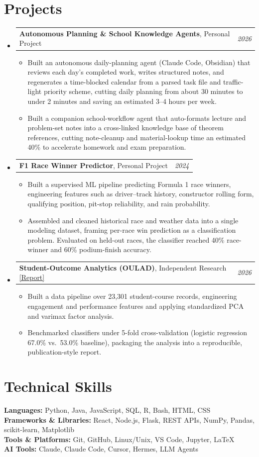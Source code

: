 \documentclass[letterpaper,11pt]{article}
\makeatletter
\newcommand{\resumeItem}[1]{
  \item\small{
    {#1 \vspace{-3pt}}
  }
}
\newcommand{\resumeProjectHeading}[2]{
    \item
    \begin{tabular*}{0.97\textwidth}{l@{\extracolsep{\fill}}r}
      \small#1 & #2 \\
    \end{tabular*}\vspace{-5pt}
}
\newcommand{\resumeSubHeadingListStart}{\begin{itemize}[leftmargin=0.15in, label={}]}
\newcommand{\resumeSubHeadingListEnd}{\end{itemize}}
\newcommand{\resumeItemListStart}{\begin{itemize}}
\newcommand{\resumeItemListEnd}{\end{itemize}\vspace{-7pt}}
\makeatother
\begin{document}
\section{Projects}
  \resumeSubHeadingListStart
    \resumeProjectHeading
      {{\bf Autonomous Planning \& School Knowledge Agents}, Personal Project}{{\em 2026}}
      \resumeItemListStart
        \resumeItem{Built an autonomous daily-planning agent (Claude Code, Obsidian) that reviews each day's completed work, writes structured notes, and regenerates a time-blocked calendar from a parsed task file and traffic-light priority scheme, cutting daily planning from about 30 minutes to under 2 minutes and saving an estimated 3--4 hours per week.}
        \resumeItem{Built a companion school-workflow agent that auto-formats lecture and problem-set notes into a cross-linked knowledge base of theorem references, cutting note-cleanup and material-lookup time an estimated 40\% to accelerate homework and exam preparation.}
      \resumeItemListEnd
    \resumeProjectHeading
      {{\bf F1 Race Winner Predictor}, Personal Project}{{\em 2024}}
      \resumeItemListStart
        \resumeItem{Built a supervised ML pipeline predicting Formula 1 race winners, engineering features such as driver--track history, constructor rolling form, qualifying position, pit-stop reliability, and rain probability.}
        \resumeItem{Assembled and cleaned historical race and weather data into a single modeling dataset, framing per-race win prediction as a classification problem. Evaluated on held-out races, the classifier reached 40\% race-winner and 60\% podium-finish accuracy.}
      \resumeItemListEnd
    \resumeProjectHeading
      {{\bf Student-Outcome Analytics (OULAD)}, Independent Research \href{https://avi-gobrin.github.io/personal-site/assets/oulad-sta437.pdf}{\color{blue}[Report]}}{{\em 2026}}
      \resumeItemListStart
        \resumeItem{Built a data pipeline over 23,301 student-course records, engineering engagement and performance features and applying standardized PCA and varimax factor analysis.}
        \resumeItem{Benchmarked classifiers under 5-fold cross-validation (logistic regression 67.0\% vs.\ 53.0\% baseline), packaging the analysis into a reproducible, publication-style report.}
      \resumeItemListEnd
  \resumeSubHeadingListEnd

\section{Technical Skills}
 \begin{itemize}[leftmargin=0.15in, label={}]
    \small{\item{
     \textbf{Languages:} Python, Java, JavaScript, SQL, R, Bash, HTML, CSS \\
     \textbf{Frameworks \& Libraries:} React, Node.js, Flask, REST APIs, NumPy, Pandas, scikit-learn, Matplotlib \\
     \textbf{Tools \& Platforms:} Git, GitHub, Linux/Unix, VS Code, Jupyter, \LaTeX \\
     \textbf{AI Tools:} Claude, Claude Code, Cursor, Hermes, LLM Agents
    }}
 \end{itemize}
\end{document}
